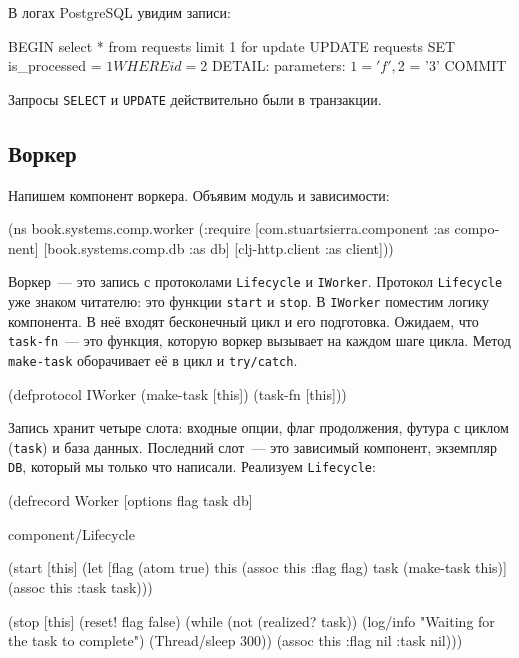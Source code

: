 \noindent
В логах PostgreSQL увидим записи:


\begin{english}
  \begin{sql}
BEGIN
select * from requests limit 1 for update
UPDATE requests SET is_processed = $1 WHERE id = $2
DETAIL:  parameters: $1 = 'f', $2 = '3'
COMMIT
  \end{sql}
\end{english}

\noindent
Запросы \verb|SELECT| и \verb|UPDATE| действительно были в транзакции.

\subsection{Воркер}

Напишем компонент воркера. Объявим модуль и зависимости:

\begin{english}
  \begin{clojure}
(ns book.systems.comp.worker
  (:require
   [com.stuartsierra.component :as component]
   [book.systems.comp.db :as db]
   [clj-http.client :as client]))
  \end{clojure}
\end{english}


Воркер~--- это запись с протоколами \verb|Lifecycle| и \verb|IWorker|. Протокол
\verb|Lifecycle| уже знаком читателю: это функции \verb|start| и
\verb|stop|. В \verb|IWorker| поместим логику компонента. В неё входят
бесконечный цикл и его подготовка. Ожидаем, что \verb|task-fn|~--- это функция,
которую воркер вызывает на каждом шаге цикла. Метод \verb|make-task|
оборачивает её в цикл и \verb|try/catch|.

\begin{english}
  \begin{clojure}
(defprotocol IWorker
  (make-task [this])
  (task-fn [this]))
  \end{clojure}
\end{english}

Запись хранит четыре слота: входные опции, флаг продолжения, футура с циклом
(\verb|task|) и база данных. Последний слот~--- это зависимый компонент, экземпляр
\verb|DB|, который мы только что написали. Реализуем \verb|Lifecycle|:

\begin{english}
  \begin{clojure/lines}
(defrecord Worker
  [options flag task db]

  component/Lifecycle

  (start [this]
    (let [flag (atom true)
          this (assoc this :flag flag)
          task (make-task this)]
      (assoc this :task task)))

  (stop [this]
    (reset! flag false)
    (while (not (realized? task))
      (log/info "Waiting for the task to complete")
      (Thread/sleep 300))
    (assoc this :flag nil :task nil)))
  \end{clojure/lines}
\end{english}

